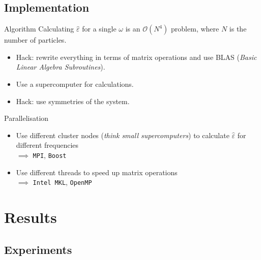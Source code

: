 \documentclass{beamer}
\begin{document}
\subsection{Implementation}

\begin{frame}{Algorithm}
    Calculating $\hat\varepsilon$ for a single $\omega$ is an \alert{$\mathcal{O}(N^4)$ problem}, where $N$ is the number of particles.
    \begin{itemize}
    \item Hack: rewrite everything in terms of \alert{matrix operations} and use BLAS (\emph{Basic Linear Algebra Subroutines}).
    \item Use a \alert{supercomputer} for calculations.
    \item Hack: use \alert{symmetries} of the system.
    \end{itemize}
\end{frame}

\begin{frame}{Parallelisation}
    \begin{itemize}
    \item Use different cluster nodes (\emph{think small supercomputers}) to calculate $\hat\varepsilon$ for different frequencies \\
        $\implies$ \texttt{MPI}, \texttt{Boost}
    \item Use different threads to speed up matrix operations \\
        $\implies$ \texttt{Intel MKL}, \texttt{OpenMP}
    \end{itemize}
\end{frame}

\section{Results}

\subsection{Experiments}
\end{document}

